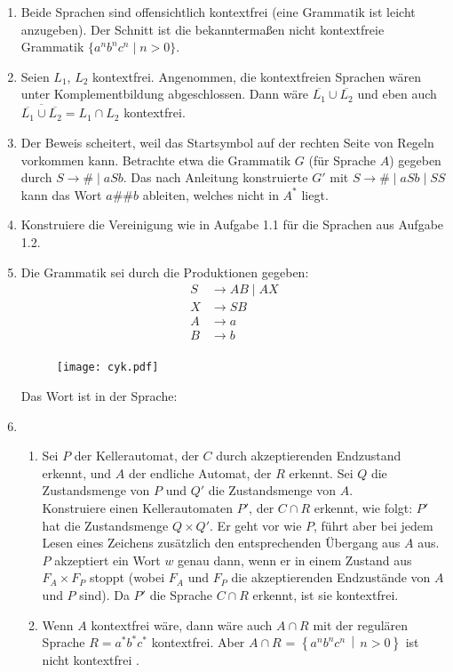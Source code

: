 \documentclass{article}
\newcommand{\menge}[2]{\ensuremath{\left\lbrace #1 \,\middle\vert\, #2 \right\rbrace}}
\newcommand{\harrypotter}{\Lightning}
\begin{document}
{\begin{enumerate}
\item Beide Sprachen sind offensichtlich kontextfrei (eine Grammatik ist leicht anzugeben). Der Schnitt ist die bekanntermaßen nicht kontextfreie Grammatik $\{a^nb^nc^n\mid  n > 0\}$.
\item Seien $L_1$, $L_2$ kontextfrei. Angenommen, die kontextfreien Sprachen wären unter Komplementbildung abgeschlossen. Dann wäre $\overline{L_1} \cup \overline{L_2}$ und eben auch $\overline{\overline{L_1} \cup \overline{L_2}} = L_1 \cap L_2$ kontextfrei.
\item Der Beweis scheitert, weil das Startsymbol auf der rechten Seite von Regeln vorkommen kann. Betrachte etwa die Grammatik $G$ (für Sprache $A$) gegeben durch $S \rightarrow \# \mid  aSb$. Das nach Anleitung konstruierte $G'$ mit $S \rightarrow \# \mid  aSb \mid  SS$ kann das Wort $a\#\#b$ ableiten, welches nicht in $A^*$ liegt.
\item Konstruiere die Vereinigung wie in Aufgabe 1.1 für die Sprachen aus Aufgabe 1.2.
\item Die Grammatik sei durch die Produktionen gegeben:
\begin{align*}
S&\rightarrow AB\mid AX\\
X&\rightarrow SB\\
A&\rightarrow a \\
B&\rightarrow b \\
\end{align*}
\begin{figure}
\centering
	\texttt{[image: cyk.pdf]}
\end{figure}
Das Wort ist in der Sprache:
\item \begin{enumerate}
	\item Sei $P$ der Kellerautomat, der $C$ durch akzeptierenden Endzustand erkennt, und $A$ der endliche Automat, der $R$ erkennt. Sei $Q$ die Zustandsmenge von $P$ und $Q'$ die Zustandsmenge von $A$. \\ Konstruiere einen Kellerautomaten $P'$, der $C \cap R$ erkennt, wie folgt: $P'$ hat die Zustandsmenge $Q \times Q'$. Er geht vor wie $P$, führt aber bei jedem Lesen eines Zeichens zusätzlich den entsprechenden Übergang aus $A$ aus. $P$ akzeptiert ein Wort $w$ genau dann, wenn er in einem Zustand aus $F_A \times F_P$ stoppt (wobei $F_A$ und $F_P$ die akzeptierenden Endzustände von $A$ und $P$ sind). Da $P'$ die Sprache $C \cap R$ erkennt, ist sie kontextfrei.
	\item Wenn $A$ kontextfrei wäre, dann wäre auch $A \cap R$ mit der regulären Sprache $R = a^*b^*c^*$ kontextfrei. Aber $A \cap R$ = $\menge{a^nb^nc^n}{n > 0}$ ist nicht kontextfrei \harrypotter.
\end{enumerate}
\end{enumerate}
}
\end{document}
